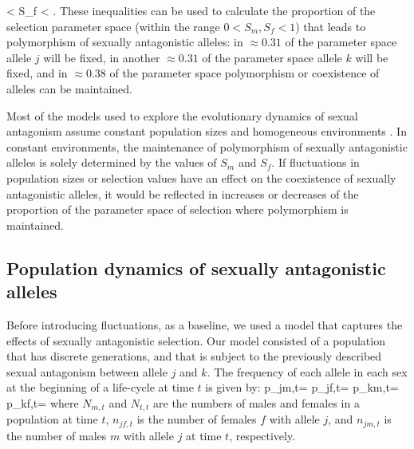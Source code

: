 \documentclass[12pt]{article}
\let\oldequation\equation
\let\oldendequation\endequation
\renewenvironment{equation}
  {\linenomathNonumbers\oldequation}
  {\oldendequation\endlinenomath}
\begin{document}
 \begin{equation}
 < S_{f} < 
\label{selection}
 \end{equation}
\citep{kidwell1977regions,pamilo1979genic,connallon_evolutionary_2018}. These inequalities can be used to calculate the proportion of the selection parameter space (within the range $ 0 < S_{m}, S_{f} < 1$) that leads to polymorphism of sexually antagonistic alleles: in $\approx 0.31$ of the parameter space allele $j$ will be fixed, in another $\approx 0.31$ of the parameter space allele $k$ will be fixed, and in $\approx 0.38$ of the parameter space polymorphism or coexistence of alleles can be maintained.

Most of the models used to explore the evolutionary dynamics of sexual antagonism assume constant population sizes and homogeneous environments \citep{kidwell1977regions,pamilo1979genic, immler2012ploidally}. In constant environments, the maintenance of polymorphism of sexually antagonistic alleles is solely determined by the values of $S_{m}$ and $S_{f}$. If fluctuations in population sizes or selection values have an effect on the coexistence of sexually antagonistic alleles, it would be reflected in increases or decreases of the proportion of the parameter space of selection where polymorphism is maintained.


\subsection*{Population dynamics of sexually antagonistic alleles}
Before introducing fluctuations, as a baseline, we used a model that captures the effects of sexually antagonistic selection. Our model consisted of a population that has discrete generations, and that is subject to the previously described sexual antagonism between allele $j$ and $k$. The frequency of each allele in each sex at the beginning of a life-cycle at time $t$ is given by:
\begin{equation}
    p_{jm,t}= 
    \label{first_pop}
\end{equation}
\begin{equation}
    p_{jf,t}= 
\end{equation}
\begin{equation}
    p_{km,t}= 
\end{equation}
\begin{equation}
    p_{kf,t}= 
\end{equation}
where $N_{m,t}$ and $N_{t,t}$ are the numbers of males and females in a population at time $t$, $n_{jf,t}$ is the number of females $f$ with allele $j$, and $n_{jm,t}$ is the number of males $m$ with allele $j$ at time $t$, respectively.
\end{document}
